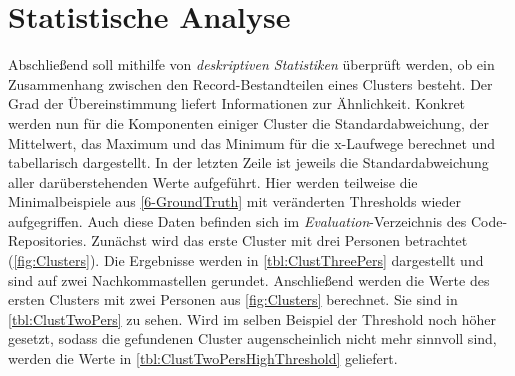 \section{Statistische Analyse}
\label{6-Statistical}
Abschließend soll mithilfe von \emph{deskriptiven Statistiken} überprüft werden,
ob ein Zusammenhang zwischen den Record-Bestandteilen eines Clusters besteht.
Der Grad der Übereinstimmung liefert Informationen zur Ähnlichkeit.
Konkret werden nun für die Komponenten einiger Cluster
die Standardabweichung, der Mittelwert, das Maximum und das Minimum für die x-Laufwege berechnet
und tabellarisch dargestellt.
In der letzten Zeile ist jeweils die Standardabweichung aller darüberstehenden Werte aufgeführt.
Hier werden teilweise die Minimalbeispiele aus \autoref{6-GroundTruth} mit veränderten Thresholds wieder aufgegriffen.
Auch diese Daten befinden sich im \emph{Evaluation}-Verzeichnis des Code-Repositories.
Zunächst wird das erste Cluster mit drei Personen betrachtet (\autoref{fig:Clusters}).
Die Ergebnisse werden in \autoref{tbl:ClustThreePers} dargestellt
und sind auf zwei Nachkommastellen gerundet.
Anschließend werden die Werte des ersten Clusters mit zwei Personen aus \autoref{fig:Clusters} berechnet.
Sie sind in \autoref{tbl:ClustTwoPers} zu sehen.
Wird im selben Beispiel der Threshold noch höher gesetzt,
sodass die gefundenen Cluster augenscheinlich nicht mehr sinnvoll sind,
werden die Werte in \autoref{tbl:ClustTwoPersHighThreshold} geliefert.
